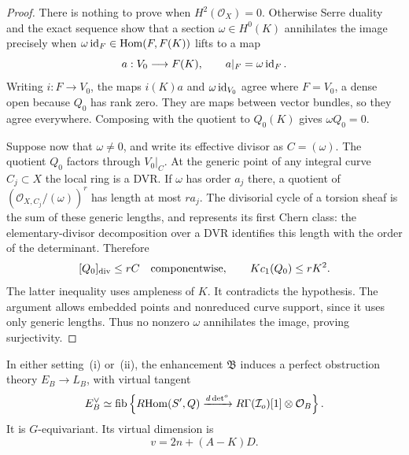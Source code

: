 \begin{proof}
There is nothing to prove when $H^2(\mathcal O_X)=0$.  Otherwise Serre
duality and the exact sequence show that a section
$\omega\in H^0(K)$ annihilates the image precisely when
$\omega\operatorname{id}_F\in\operatorname{Hom}(F,F(K))$ lifts to a map
\[
a:V_0\longrightarrow F(K),\qquad a|_F=\omega\operatorname{id}_F.
\]
Writing $i:F\to V_0$, the maps $i(K)a$ and $\omega\operatorname{id}_{V_0}$ agree
where $F=V_0$, a dense open because $Q_0$ has rank zero.  They are maps
between vector bundles, so they agree everywhere.  Composing with the
quotient to $Q_0(K)$ gives $\omega Q_0=0$.

Suppose now that $\omega\ne0$, and write its effective divisor as
$C=(\omega)$.  The quotient $Q_0$ factors through $V_0|_C$.  At the
generic point of any integral curve $C_j\subset X$ the local ring is a
DVR.  If $\omega$ has order $a_j$ there, a quotient of
$(\mathcal O_{X,C_j}/(\omega))^r$ has length at most $ra_j$.
The divisorial cycle of a torsion sheaf is the sum of these generic
lengths, and represents its first Chern class: the elementary-divisor
decomposition over a DVR identifies this length with the order of the
determinant.  Therefore
\[
[Q_0]_{\mathrm{div}}\leq rC
\quad\hbox{componentwise},\qquad
Kc_1(Q_0)\leq rK^2.
\]
The latter inequality uses ampleness of $K$.  It contradicts the
hypothesis.  The argument allows embedded points and nonreduced curve
support, since it uses only generic lengths.  Thus no nonzero
$\omega$ annihilates the image, proving surjectivity.
\end{proof}

\begin{proposition}\label{prop:quot-pot}
In either setting~\textup{(i)} or~\textup{(ii)}, the enhancement
$\mathfrak B$ induces a perfect obstruction theory
$E_B\to L_B$, with virtual tangent
\begin{equation}\label{eq:quot-tangent}
E_B^\vee\simeq
\operatorname{fib}\left\{
R\!\operatorname{Hom}(S',Q)\xrightarrow{d\det^o}
R\Gamma(\mathcal I_o)[1]\otimes\mathcal O_B
\right\}.
\end{equation}
It is $G$-equivariant.  Its virtual dimension is
\begin{equation}\label{eq:vdim}
v=2n+(A-K)D.
\end{equation}
\end{proposition}

